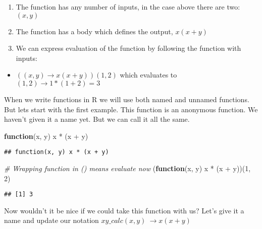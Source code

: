 \documentclass[
]{book}
\newenvironment{Shaded}{\begin{snugshade}}{\end{snugshade}}
\newcommand{\CommentTok}[1]{\textcolor[rgb]{0.56,0.35,0.01}{\textit{#1}}}
\newcommand{\ControlFlowTok}[1]{\textcolor[rgb]{0.13,0.29,0.53}{\textbf{#1}}}
\newcommand{\DecValTok}[1]{\textcolor[rgb]{0.00,0.00,0.81}{#1}}
\newcommand{\NormalTok}[1]{#1}
\newcommand{\SpecialCharTok}[1]{\textcolor[rgb]{0.00,0.00,0.00}{#1}}
\providecommand{\tightlist}{%
  \setlength{\itemsep}{0pt}\setlength{\parskip}{0pt}}
\begin{document}
\begin{enumerate}
\def\labelenumi{\arabic{enumi}.}
\tightlist
\item
  The function has any number of inputs, in the case above there are two: \((x,y)\)
\item
  The function has a body which defines the output, \(x(x + y)\)
\item
  We can express evaluation of the function by following the function with inputs:
\end{enumerate}

\begin{itemize}
\tightlist
\item
  \(((x, y)\rightarrow x(x + y))(1, 2)\) which evaluates to \((1, 2) \rightarrow 1 * (1 + 2) = 3\)
\end{itemize}

When we write functions in R we will use both named and unnamed functions. But lets start with the first example. This function is an anonymous function. We haven't given it a name yet. But we can call it all the same.

\begin{Shaded}
\begin{Highlighting}[]
\ControlFlowTok{function}\NormalTok{(x, y) x }\SpecialCharTok{*}\NormalTok{ (x }\SpecialCharTok{+}\NormalTok{ y)}
\end{Highlighting}
\end{Shaded}

\begin{verbatim}
## function(x, y) x * (x + y)
\end{verbatim}

\begin{Shaded}
\begin{Highlighting}[]
\CommentTok{\# Wrapping function in () means evaluate now}
\NormalTok{(}\ControlFlowTok{function}\NormalTok{(x, y) x }\SpecialCharTok{*}\NormalTok{ (x }\SpecialCharTok{+}\NormalTok{ y))(}\DecValTok{1}\NormalTok{, }\DecValTok{2}\NormalTok{)}
\end{Highlighting}
\end{Shaded}

\begin{verbatim}
## [1] 3
\end{verbatim}

Now wouldn't it be nice if we could take this function with us? Let's give it a name and update our notation \(xy\_calc(x, y)\ \rightarrow x(x + y)\)
\end{document}
